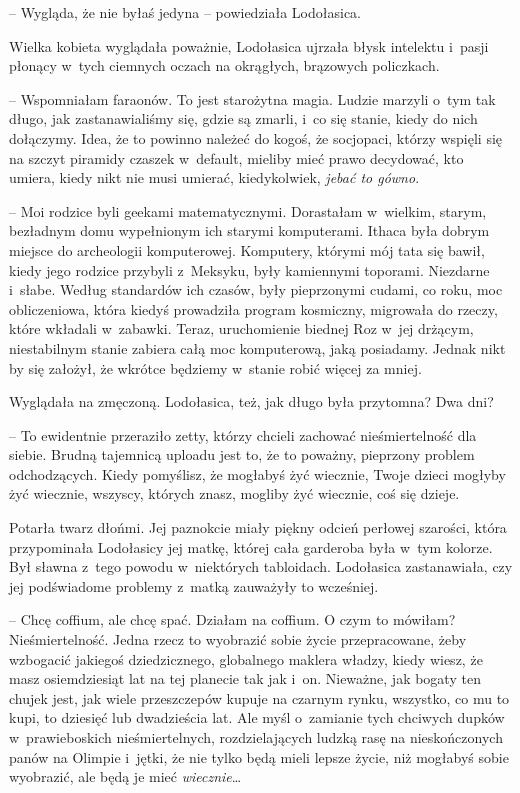 \documentclass[oneside,polish,11pt,sfheadings]{mwbk}
\begin{document}
-- Wygląda, że nie byłaś jedyna -- powiedziała Lodołasica.

Wielka kobieta wyglądała poważnie, Lodołasica ujrzała błysk intelektu i~pasji płonący w~tych ciemnych oczach na okrągłych, brązowych policzkach.

-- Wspomniałam faraonów. To jest starożytna magia. Ludzie marzyli o~tym
tak długo, jak zastanawialiśmy się, gdzie są zmarli, i~co się stanie,
kiedy do nich dołączymy. Idea, że to powinno należeć do kogoś, że
socjopaci, którzy wspięli się na szczyt piramidy czaszek w~default,
mieliby mieć prawo decydować, kto umiera, kiedy nikt nie musi umierać,
kiedykolwiek, \textit{jebać to gówno}.

-- Moi rodzice byli geekami matematycznymi. Dorastałam w~wielkim, starym,
bezładnym domu wypełnionym ich starymi komputerami. Ithaca była dobrym
miejsce do archeologii komputerowej. Komputery, którymi mój tata się
bawił, kiedy jego rodzice przybyli z~Meksyku, były kamiennymi toporami.
Niezdarne i~słabe. Według standardów ich czasów, były pieprzonymi
cudami, co roku, moc obliczeniowa, która kiedyś prowadziła program
kosmiczny, migrowała do rzeczy, które wkładali w~zabawki. Teraz,
uruchomienie biednej Roz w~jej drżącym, niestabilnym stanie zabiera całą
moc komputerową, jaką posiadamy. Jednak nikt by się założył, że wkrótce
będziemy w~stanie robić więcej za mniej.

Wyglądała na zmęczoną. Lodołasica, też, jak długo była przytomna? Dwa
dni? 

-- To ewidentnie przeraziło zetty, którzy chcieli zachować
nieśmiertelność dla siebie. Brudną tajemnicą uploadu jest to, że to
poważny, pieprzony problem odchodzących. Kiedy pomyślisz, że mogłabyś
żyć wiecznie, Twoje dzieci mogłyby żyć wiecznie, wszyscy, których znasz,
mogliby żyć wiecznie, coś się dzieje.

Potarła twarz dłońmi. Jej paznokcie miały piękny odcień perłowej
szarości, która przypominała Lodołasicy jej matkę, której cała garderoba
była w~tym kolorze. Był sławna z~tego powodu w~niektórych tabloidach.
Lodołasica zastanawiała, czy jej podświadome problemy z~matką zauważyły
to wcześniej.

-- Chcę coffium, ale chcę spać. Działam na coffium. O czym to mówiłam?
Nieśmiertelność. Jedna rzecz to wyobrazić sobie życie przepracowane,
żeby wzbogacić jakiegoś dziedzicznego, globalnego maklera władzy, kiedy
wiesz, że masz osiemdziesiąt lat na tej planecie tak jak i~on. Nieważne,
jak bogaty ten chujek jest, jak wiele przeszczepów kupuje na czarnym
rynku, wszystko, co mu to kupi, to dziesięć lub dwadzieścia lat. Ale
myśl o~zamianie tych chciwych dupków w~prawieboskich nieśmiertelnych,
rozdzielających ludzką rasę na nieskończonych panów na Olimpie i~jętki,
że nie tylko będą mieli lepsze życie, niż mogłabyś sobie wyobrazić, ale
będą je mieć \textit{wiecznie}\ldots 
\end{document}
